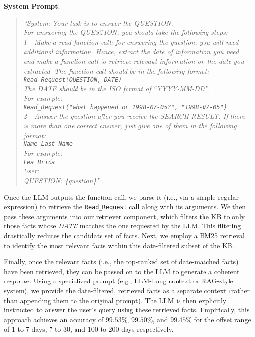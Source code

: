 \documentclass[11pt]{article}
\begin{document}
\textbf{System Prompt}:
\begin{quote}
\emph{``System: Your task is to answer the QUESTION.\\
For answering the QUESTION, you should take the following steps:\\
1 - Make a read function call: for answering the question, you will need additional information. Hence, extract the date of information you need and make a function call to retrieve relevant information on the date you extracted. The function call should be in the following format:\\
\texttt{Read\_Request(QUESTION, DATE)}\\
The DATE should be in the ISO format of ``YYYY-MM-DD''.\\
For example:\\
\texttt{Read\_Request("what happened on 1998-07-05?", "1998-07-05")}\\
2 - Answer the question after you receive the SEARCH RESULT.
If there is more than one correct answer, 
just give one of
them in the following format:\\
\texttt{Name Last\_Name}\\
For example:\\
\texttt{Lea Brida}\\
User:\\
QUESTION: \{question\}''} \\
\end{quote}

Once the LLM outputs the function call, we parse it (i.e., 
via a simple regular expression) to retrieve
the \texttt{Read\_Request} call along with its arguments. We
then pass these arguments into our retriever component,
which filters the KB to only those facts whose \textit{DATE}
matches the one requested by the LLM. This filtering
drastically reduces the candidate set of facts. Next, we
employ a BM25 retrieval  to identify
the most relevant facts within this date-filtered subset of
the KB.

Finally, once the relevant facts (i.e., the top-ranked set
of date-matched facts) have been retrieved, they can be
passed on to the LLM to generate a coherent response. Using
a specialized prompt (e.g., LLM-Long context or RAG-style
system), we provide the date-filtered, retrieved facts as a
separate context (rather than appending them to the original
prompt). The LLM is then explicitly instructed to answer the
user’s query using these retrieved facts. Empirically, this
approach achieves an accuracy of $99.53\%$, $99.50\%$, and
$99.45\%$ for the offset range of 1 to 7 days, 7 to 30, and
100 to 200 days respectively.
\end{document}
